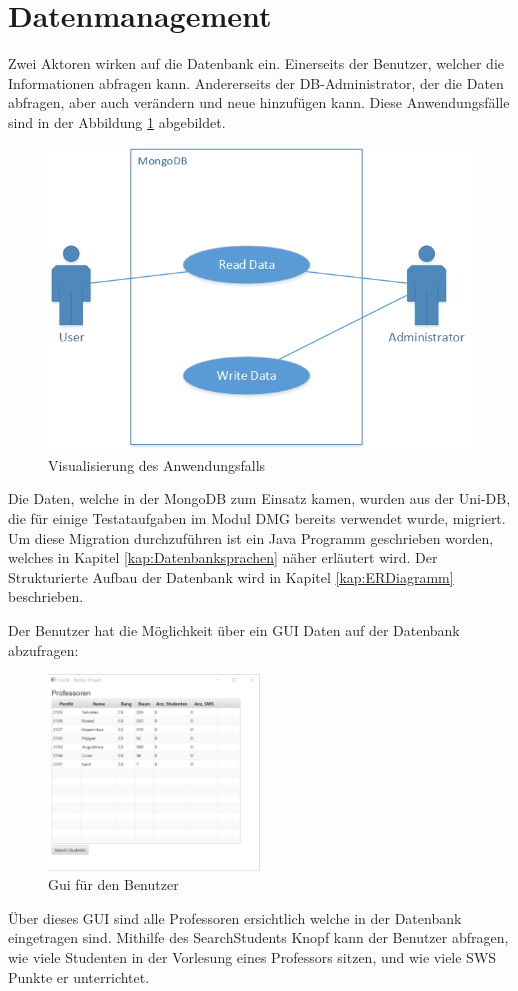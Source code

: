 \section{Datenmanagement}
Zwei Aktoren wirken auf die Datenbank ein. Einerseits der Benutzer, welcher die
Informationen abfragen kann. Andererseits der DB-Administrator, der die
Daten abfragen, aber auch verändern und neue hinzufügen kann. Diese
Anwendungsfälle sind in der Abbildung \ref{fig:usecase} abgebildet.

\begin{figure}[h]
  \centering
     \includegraphics[width=1\textwidth]{./pictures/UseCase.png}
  \caption{Visualisierung des Anwendungsfalls}
  \label{fig:usecase}
\end{figure}
\noindent
Die Daten, welche in der MongoDB zum Einsatz kamen, wurden aus der Uni-DB, die für einige Testataufgaben im Modul DMG bereits verwendet wurde, migriert. Um diese Migration durchzuführen ist ein Java Programm geschrieben worden, welches in Kapitel \ref{kap:Datenbanksprachen} näher erläutert wird. Der Strukturierte Aufbau der Datenbank wird in Kapitel \ref{kap:ERDiagramm} beschrieben.

\newpage
\noindent
Der Benutzer hat die Möglichkeit über ein GUI Daten auf der Datenbank abzufragen:
\begin{figure}[h]
	\centering
	\includegraphics[width=0.5\textwidth]{./pictures/UniDBView.png}
	\caption{Gui für den Benutzer}
	\label{fig:GUI1}
\end{figure}
\noindent
Über dieses GUI sind alle Professoren ersichtlich welche in der Datenbank eingetragen sind.
Mithilfe des SearchStudents Knopf kann der Benutzer abfragen, wie viele Studenten in der Vorlesung eines Professors sitzen, und wie viele SWS Punkte er unterrichtet.